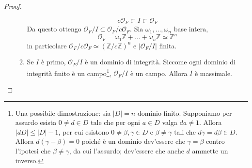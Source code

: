 \begin{proof}
\begin{enumerate}
\begin{enumerate}
			\begin{equation*}
			c\mathcal{O}_F\subset I\subset \mathcal{O}_F
			\end{equation*}
			Da questo ottengo $\mathcal{O}_F/I \subset \mathcal{O}_F/c\mathcal{O}_F$. Sia $\omega_1,\dots,\omega_n$ base intera,
			\begin{equation*}
			\mathcal{O}_F=\omega_1\mathbb{Z}+\dots+\omega_n\mathbb{Z}\simeq\mathbb{Z}^n
			\end{equation*}
			in particolare $\mathcal{O}_F/c\mathcal{O}_F\simeq\left(\mathbb{Z}/c\mathbb{Z}\right)^n$ e $\left|\mathcal{O}_F/I\right|$ finita.
			\item Se $I$ è primo, $\mathcal{O}_F/I$ è un dominio di integrità. Siccome ogni dominio di integrità finito è un campo\footnote{
				Una possibile dimostrazione: 
				sia $|D| = n$ dominio finito. 
				Supponiamo per assurdo esista $0 \neq d \in D$ 
				tale che per ogni $a \in D$ valga $da \neq 1$. 
				Allora $|dD| \le |D|-1$, per cui esistono 
				$0 \neq \beta, \gamma \in D$ e $\beta \neq \gamma$ 
				tali che $d\gamma = d\beta \in D$. 
				Allora $d(\gamma-\beta) = 0$ poiché è un dominio 
				dev'essere che $\gamma = \beta$ contro l'ipotesi 
				che $\beta \neq \gamma$, da cui l'assurdo; 
				dev'essere che anche $d$ ammette un inverso.}, $\mathcal{O}_F/I$ è un campo. Allora $I$ è massimale.
		\end{enumerate}
	\end{enumerate}
\end{proof}

